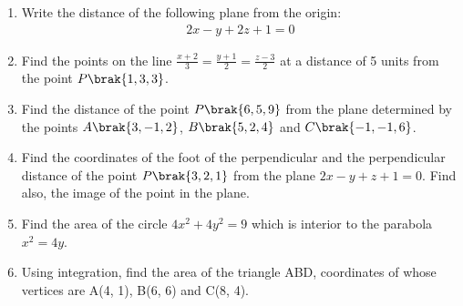 \begin{enumerate}

\item Write the distance of the following plane from the origin:
    \begin{align*}
    2x - y + 2z + 1 = 0
    \end{align*}

\item Find the points on the line $\frac{x+2}{3} = \frac{y+1}{2} = \frac{z-3}{2}$ at a distance of 5 units from the point $P\brak{1, 3, 3}$.

\item Find the distance of the point $P\brak{6, 5, 9}$ from the plane determined by the points $A\brak{3, -1, 2}$, $B\brak{5, 2, 4}$ and $C\brak{-1, -1, 6}$.

\item Find the coordinates of the foot of the perpendicular and the perpendicular distance of the point $P\brak{3, 2, 1}$ from the plane $2x - y + z + 1 = 0$. Find also, the image of the point in the plane.

\item Find the area of the circle $4x^2 + 4y^2 = 9$ which is interior to the parabola $x^2 = 4y$.

\item Using integration, find the area of the triangle ABD, coordinates of whose vertices are A(4, 1), B(6, 6) and C(8, 4).

\end{enumerate}
